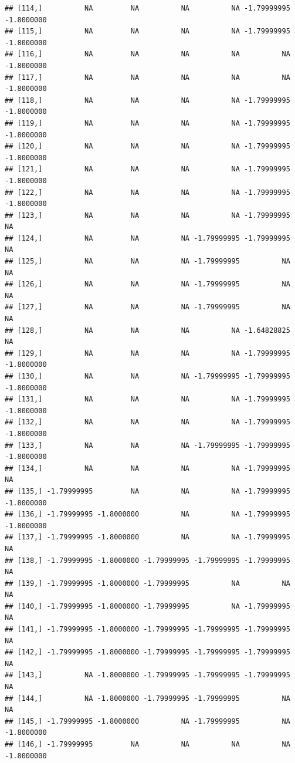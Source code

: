 \documentclass{article}\usepackage[]{graphicx}\usepackage[]{color}
\makeatletter
\newenvironment{kframe}{%
 \def\at@end@of@kframe{}%
 \ifinner\ifhmode%
  \def\at@end@of@kframe{\end{minipage}}%
  \begin{minipage}{\columnwidth}%
 \fi\fi%
 \def\FrameCommand##1{\hskip\@totalleftmargin \hskip-\fboxsep
 \colorbox{shadecolor}{##1}\hskip-\fboxsep
     \hskip-\linewidth \hskip-\@totalleftmargin \hskip\columnwidth}%
 \MakeFramed {\advance\hsize-\width
   \@totalleftmargin\z@ \linewidth\hsize
   \@setminipage}}%
 {\par\unskip\endMakeFramed%
 \at@end@of@kframe}
\newenvironment{knitrout}{}{} %
\makeatother
\begin{document}
\begin{knitrout}
\begin{kframe}
\begin{verbatim}
## [114,]          NA         NA          NA          NA -1.79999995 -1.8000000
## [115,]          NA         NA          NA          NA -1.79999995 -1.8000000
## [116,]          NA         NA          NA          NA          NA -1.8000000
## [117,]          NA         NA          NA          NA          NA -1.8000000
## [118,]          NA         NA          NA          NA -1.79999995 -1.8000000
## [119,]          NA         NA          NA          NA -1.79999995 -1.8000000
## [120,]          NA         NA          NA          NA -1.79999995 -1.8000000
## [121,]          NA         NA          NA          NA -1.79999995 -1.8000000
## [122,]          NA         NA          NA          NA -1.79999995 -1.8000000
## [123,]          NA         NA          NA          NA -1.79999995         NA
## [124,]          NA         NA          NA -1.79999995 -1.79999995         NA
## [125,]          NA         NA          NA -1.79999995          NA         NA
## [126,]          NA         NA          NA -1.79999995          NA         NA
## [127,]          NA         NA          NA -1.79999995          NA         NA
## [128,]          NA         NA          NA          NA -1.64828825         NA
## [129,]          NA         NA          NA          NA -1.79999995 -1.8000000
## [130,]          NA         NA          NA -1.79999995 -1.79999995 -1.8000000
## [131,]          NA         NA          NA          NA -1.79999995 -1.8000000
## [132,]          NA         NA          NA          NA -1.79999995 -1.8000000
## [133,]          NA         NA          NA -1.79999995 -1.79999995 -1.8000000
## [134,]          NA         NA          NA          NA -1.79999995         NA
## [135,] -1.79999995         NA          NA          NA -1.79999995 -1.8000000
## [136,] -1.79999995 -1.8000000          NA          NA -1.79999995 -1.8000000
## [137,] -1.79999995 -1.8000000          NA          NA -1.79999995         NA
## [138,] -1.79999995 -1.8000000 -1.79999995 -1.79999995 -1.79999995         NA
## [139,] -1.79999995 -1.8000000 -1.79999995          NA          NA         NA
## [140,] -1.79999995 -1.8000000 -1.79999995          NA -1.79999995         NA
## [141,] -1.79999995 -1.8000000 -1.79999995 -1.79999995 -1.79999995         NA
## [142,] -1.79999995 -1.8000000 -1.79999995 -1.79999995 -1.79999995         NA
## [143,]          NA -1.8000000 -1.79999995 -1.79999995 -1.79999995         NA
## [144,]          NA -1.8000000 -1.79999995 -1.79999995          NA         NA
## [145,] -1.79999995 -1.8000000          NA -1.79999995          NA -1.8000000
## [146,] -1.79999995         NA          NA          NA          NA -1.8000000

\end{verbatim}
\end{kframe}
\end{knitrout}
\end{document}

